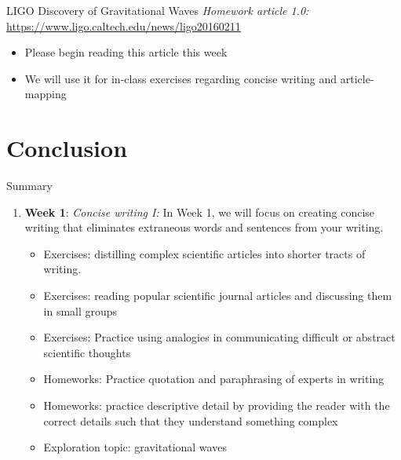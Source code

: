 \documentclass{beamer}
\begin{document}
\begin{frame}{LIGO Discovery of Gravitational Waves}
\textit{Homework article 1.0:} \\
\url{https://www.ligo.caltech.edu/news/ligo20160211} \\
\begin{itemize}
\item Please begin reading this article this week
\item We will use it for in-class exercises regarding concise writing and article-mapping
\end{itemize}
\end{frame}

\section{Conclusion}

\begin{frame}{Summary}
\begin{enumerate}
\item \textbf{Week 1}: \textit{Concise writing I:} In Week 1, we will focus on creating concise writing that eliminates extraneous words and sentences from your writing.
\begin{itemize}
\item Exercises: distilling complex scientific articles into shorter tracts of writing.
\item Exercises: reading popular scientific journal articles and discussing them in small groups
\item Exercises: Practice using analogies in communicating difficult or abstract scientific thoughts
\item Homeworks: Practice quotation and paraphrasing of experts in writing
\item Homeworks: practice descriptive detail by providing the reader with the correct details such that they understand something complex
\item Exploration topic: gravitational waves
\end{itemize}
\end{enumerate}
\end{frame}
\end{document}
